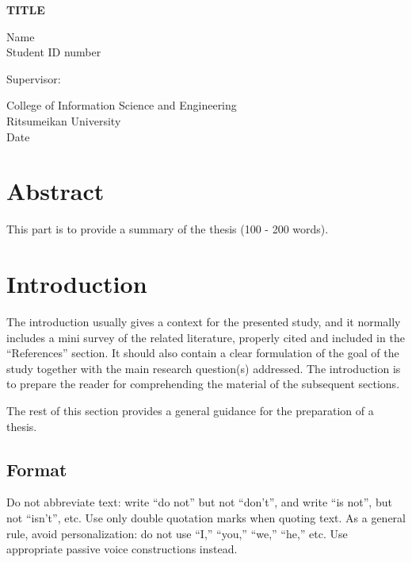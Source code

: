 \documentclass[12pt]{report}
\begin{document}
\begin{titlepage}
   \begin{center}
       \vspace*{5cm}

       \textbf{\Huge{TITLE}}
       \vspace{3cm}

       \Large{Name}\\{Student ID number}

       \vfill
            
       Supervisor:
            
       \vspace{1cm}
            
       College of Information Science and Engineering\\
       Ritsumeikan University\\
       Date
            
   \end{center}
\end{titlepage}

\chapter*{Abstract}
This part is to provide a summary of the thesis (100 - 200 words).
\tableofcontents
\let\origaddvspace\addvspace
\renewcommand{\addvspace}[1]{}
\listoffigures
{}
\listoftables
{}
\renewcommand{\addvspace}[1]{\origaddvspace{#1}}

\chapter{Introduction}
The introduction usually gives a context for the presented study, and it normally includes a mini survey of the related literature, properly cited and included in the “References” section. It should also contain a clear formulation of the goal of the study together with the main research question(s) addressed. The introduction is to prepare the reader for comprehending the material of the subsequent sections.

The rest of this section provides a general guidance for the preparation of a thesis.

\section{Format}
Do not abbreviate text: write “do not” but not “don’t”, and write “is not”, but not “isn't”, etc. Use only double quotation marks when quoting text. As a general rule, avoid personalization: do not use “I,” “you,” “we,” “he,” etc. Use appropriate passive voice constructions instead.
\end{document}
